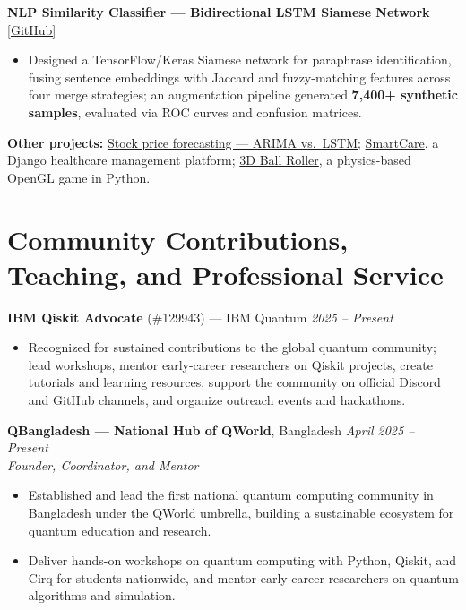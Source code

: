 \documentclass[a4paper,10pt]{article}
\begin{document}
\textbf{NLP Similarity Classifier --- Bidirectional LSTM Siamese Network}
\hfill
\href{https://github.com/saifibnaezhararko/NLP-Similarity-Classifier-Bidirectional-LSTM-based-Siamese-network-with-multiple-merge-strategies}{[GitHub]}

\begin{itemize}
    \item Designed a TensorFlow/Keras Siamese network for paraphrase identification, fusing sentence embeddings with Jaccard and fuzzy-matching features across four merge strategies; an augmentation pipeline generated \textbf{7{,}400+ synthetic samples}, evaluated via ROC curves and confusion matrices.
\end{itemize}

\textbf{Other projects:}
\href{https://tinyurl.com/59uzaj9r}{Stock price forecasting --- ARIMA vs.\ LSTM};
\href{https://github.com/saifibnaezhararko/SmartCare-Healthcare-Based-Django-website-}{SmartCare}, a Django healthcare management platform;
\href{https://github.com/saifibnaezhararko/CSE423_Lab-Project-3D-Ball-Roller}{3D Ball Roller}, a physics-based OpenGL game in Python.

\section*{Community Contributions, Teaching, and Professional Service}

\textbf{IBM Qiskit Advocate} (\#129943) --- IBM Quantum
\hfill
\textit{2025 -- Present}

\begin{itemize}
    \item Recognized for sustained contributions to the global quantum community; lead workshops, mentor early-career researchers on Qiskit projects, create tutorials and learning resources, support the community on official Discord and GitHub channels, and organize outreach events and hackathons.
\end{itemize}

\vspace{2pt}
\textbf{QBangladesh --- National Hub of QWorld}, Bangladesh
\hfill
\textit{April 2025 -- Present}
\\
\textit{Founder, Coordinator, and Mentor}

\begin{itemize}
    \item Established and lead the first national quantum computing community in Bangladesh under the QWorld umbrella, building a sustainable ecosystem for quantum education and research.

    \item Deliver hands-on workshops on quantum computing with Python, Qiskit, and Cirq for students nationwide, and mentor early-career researchers on quantum algorithms and simulation.
\end{itemize}
\end{document}
